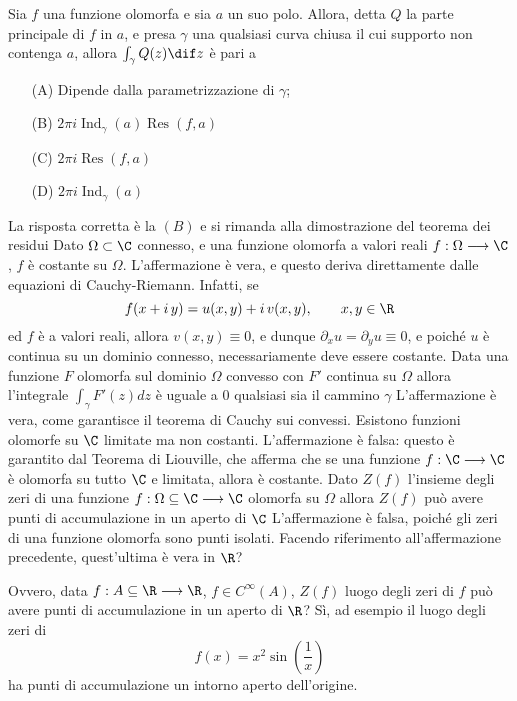     Sia $f$ una funzione olomorfa e sia $a$ un suo polo. Allora, detta $Q$ la parte principale di $f$ in $a$, e presa $\gamma$ una qualsiasi curva chiusa il cui supporto non contenga $a$, allora $\int_{\gamma} Q(z) \dif z$ è pari a \begin{itemize}
        \item[(A)] Dipende dalla parametrizzazione di $\gamma$;
        \item[(B)] $2\pi i \operatorname{Ind}_{\gamma}(a) \operatorname{Res}(f,a)$
        \item[(C)] $2\pi i \operatorname{Res}(f,a)$
        \item[(D)] $2\pi i \operatorname{Ind}_{\gamma}(a)$
    \end{itemize}
    La risposta corretta è la $(B)$ e si rimanda alla dimostrazione del teorema dei residui
    Dato $\Omega\subset\C$ connesso, e una funzione olomorfa a valori reali $f:\Omega\longrightarrow\C$, $ f $ è costante su $\Omega$. 
    L'affermazione è vera, e questo deriva direttamente dalle equazioni di Cauchy-Riemann. Infatti, se \[
        f(x+i\,y) = u(x,y) + i\,v(x,y),\qquad x,y \in \R
    \]ed $ f $ è a valori reali, allora $ v(x,y)\equiv 0 $, e dunque $ \partial_{x} u = \partial_{y} u \equiv 0 $, e poiché $ u $ è continua su un dominio connesso, necessariamente deve essere costante.
    Data una funzione $F$ olomorfa sul dominio $\Omega$ convesso con $F'$ continua su $\Omega$ allora l'integrale $\int_{\gamma}F'(z)dz$ è uguale a 0 qualsiasi sia il cammino $\gamma$
    L'affermazione è vera, come garantisce il teorema di Cauchy sui convessi. 
    Esistono funzioni olomorfe su $ \C $ limitate ma non costanti.
    L'affermazione è falsa: questo è garantito dal Teorema di Liouville, che afferma che se una funzione $ f: \C \longrightarrow \C $ è olomorfa su tutto $ \C $ e limitata, allora è costante.
    Dato $Z(f)$ l'insieme degli zeri di una funzione $f:\Omega \subseteq \C\longrightarrow\C$ olomorfa su $\Omega$ allora $Z(f)$ può avere punti di accumulazione in un aperto di $\C$
    L'affermazione è falsa, poiché gli zeri di una funzione olomorfa sono punti isolati. 
    Facendo riferimento all'affermazione precedente, quest'ultima è vera in $ \R $? 

    Ovvero, data $ f: A \subseteq \R \longrightarrow \R $, $ f \in C^{ \infty}(A) $, $ Z(f) $ luogo degli zeri di $ f $ può avere punti di accumulazione in un aperto di $ \R $?
    Sì, ad esempio il luogo degli zeri di \[
        f(x)= x^{2}\sin \left(\frac{1}{x}\right)
    \]ha punti di accumulazione un intorno aperto dell'origine.
    
